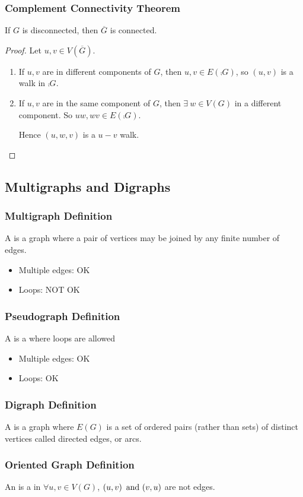 \subsubsection*{Complement Connectivity Theorem}
If $G$ is disconnected, then $\overline{G}$ is connected.
\begin{proof}
    Let $u,v \in V(\overline{G})$.
    \begin{enumerate}[start=1,label={\bfseries Case \arabic*:},leftmargin=0.75in]
        \item If $u,v$ are in different components of $G$, then $u,v \in E(\comp{G})$, so $(u,v)$ is a walk in $\comp{G}$.
        \item If $u,v$ are in the same component of $G$, then $\exists~ w \in V(G)$ in a different component. So $uw, wv \in E(\comp{G})$.

              Hence $(u,w,v)$ is a $u-v$ walk.
    \end{enumerate}
\end{proof}

\subsection{Multigraphs and Digraphs}

\subsubsection*{Multigraph Definition}
A  is a graph where a pair of vertices may be joined by any finite number of edges.
\begin{itemize}
    \item Multiple edges: OK
    \item Loops: NOT OK
\end{itemize}

\subsubsection*{Pseudograph Definition}
A  is a  where loops are allowed
\begin{itemize}
    \item Multiple edges: OK
    \item Loops: OK
\end{itemize}

\subsubsection*{Digraph Definition}
A  is a graph where $E(G)$ is a set of ordered pairs (rather than sets) of distinct vertices called directed edges, or arcs.

\subsubsection*{Oriented Graph Definition}
An  is a  in $\forall u,v \in V(G)$, $(u,v) \operatorname{~\text{and}~} (v,u)$ are not  edges.